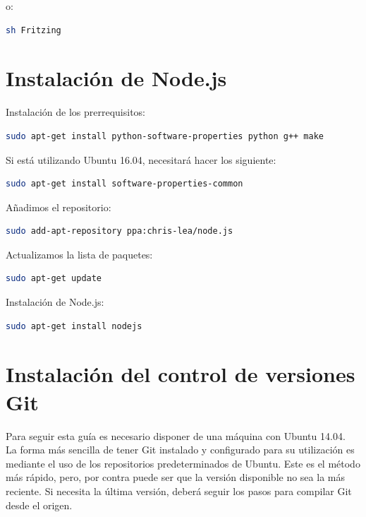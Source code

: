 \begin{appendix}
o:

\begin{lstlisting}[language=bash]
sh Fritzing
\end{lstlisting}


\section{Instalación de Node.js}

Instalación de los prerrequisitos:\\

\begin{lstlisting}[language=bash]
sudo apt-get install python-software-properties python g++ make
\end{lstlisting}


Si está utilizando Ubuntu 16.04, necesitará hacer los siguiente:\\

\begin{lstlisting}[language=bash]
sudo apt-get install software-properties-common
\end{lstlisting}


Añadimos el repositorio:\\

\begin{lstlisting}[language=bash]
sudo add-apt-repository ppa:chris-lea/node.js
\end{lstlisting}

Actualizamos la lista de paquetes:\\

\begin{lstlisting}[language=bash]
sudo apt-get update
\end{lstlisting}

Instalación de  Node.js:\\

\begin{lstlisting}[language=bash]
sudo apt-get install nodejs
\end{lstlisting}

\section{Instalación del control de versiones Git}

Para seguir esta guía es necesario disponer de una máquina con Ubuntu 14.04.\\

La forma más sencilla de tener Git instalado y configurado para su utilización es mediante el uso de los repositorios predeterminados de Ubuntu. 
Este es el método más rápido, pero, por contra puede ser que la versión disponible no sea la más reciente. 
Si necesita la última versión, deberá seguir los pasos para compilar Git desde el origen.\\


\end{appendix}
